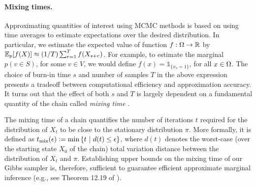 \paragraph{Mixing times.}
Approximating quantities of interest using MCMC methods is based on using time averages to estimate expectations over the desired distribution.
In particular, we estimate the expected value of function $f : \ss \to \mathbb{R}$ by $\E_p[f(X)] \approx (1/T)\sum_{r=1}^{T} f(X_{s + r})$.
For example, to estimate the marginal $p(v \in S)$, for some $v \in V$, we would define $f(x) = \mathds{1}_{\{x_v = 1\}}$, for all $x \in \ss$.
The choice of burn-in time $s$ and number of samples $T$ in the above expression presents a tradeoff between computational efficiency and approximation accuracy.
It turns out that the effect of both $s$ and $T$ is largely dependent on a fundamental quantity of the chain called \emph{mixing time} \cite{levin08}.

The mixing time of a chain quantifies the number of iterations $t$ required for the distribution of $X_t$ to be close to the stationary distribution $\pi$.
More formally, it is defined as $\tme \defeq \min \sdef{t}{d(t) \leq \epsilon}$, where $d(t)$ denotes the worst-case (over the starting state $X_0$ of the chain) total variation distance between the distribution of $X_t$ and $\pi$.
Establishing upper bounds on the mixing time of our Gibbs sampler is, therefore, sufficient to guarantee efficient approximate marginal inference (e.g., see Theorem 12.19 of \citet{levin08}).